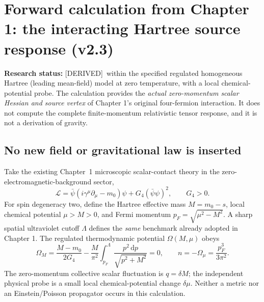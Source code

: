 \documentclass[11pt,a4paper]{article}
\theoremstyle{remark}\newtheorem{remark}[theorem]{Remark}
\newcommand{\dd}{\mathrm d}\newcommand{\Tr}{\operatorname{Tr}}\newcommand{\cO}{\mathcal O}\newcommand{\cG}{\mathcal G}\newcommand{\cH}{\mathcal H}\newcommand{\cE}{\mathcal E}\newcommand{\cK}{\mathcal K}\newcommand{\AX}{\textsf{[AXIOM]}}\newcommand{\D}{\textsf{[DERIVED]}}\newcommand{\C}{\textsf{[CONDITIONAL]}}\newcommand{\OPEN}{\textsf{[OPEN]}}
\begin{document}
\section{Forward calculation from Chapter 1: the interacting Hartree source response (v2.3)}\label{sec:v23-hartree}
\textbf{Research status:} \D\ within the specified regulated homogeneous Hartree (leading mean-field) model at zero temperature, with a local chemical-potential probe. The calculation provides the \emph{actual zero-momentum scalar Hessian and source vertex} of Chapter 1's original four-fermion interaction. It does not compute the complete finite-momentum relativistic tensor response, and it is not a derivation of gravity.

\subsection{No new field or gravitational law is inserted}
Take the existing Chapter~1 microscopic scalar-contact theory in the zero-electromagnetic-background sector, 
\begin{equation}\label{eq:v23-micro}
\mathcal L=\bar\psi(i\gamma^\mu\partial_\mu-m_0)\psi+G_4(\bar\psi\psi)^2,
\qquad G_4>0.
\end{equation}
For spin degeneracy two, define the Hartree effective mass $M=m_0-s$, local chemical potential $\mu>M>0$, and Fermi momentum $p_F=\sqrt{\mu^2-M^2}$. A sharp spatial ultraviolet cutoff $\Lambda$ defines the \emph{same} benchmark already adopted in Chapter 1. The regulated thermodynamic potential $\Omega(M,\mu)$ obeys
\begin{equation}\label{eq:v23-gap}
\Omega_M=\frac{M-m_0}{2G_4}-\frac{M}{\pi^2}\int_{p_F}^{\Lambda}\frac{p^2\,\dd p}{\sqrt{p^2+M^2}}=0,
\qquad n=-\Omega_\mu=\frac{p_F^3}{3\pi^2}.
\end{equation}
The zero-momentum collective scalar fluctuation is $q=\delta M$; the independent physical probe is a small local chemical-potential change $\delta\mu$. Neither a metric nor an Einstein/Poisson propagator occurs in this calculation.
\end{document}
